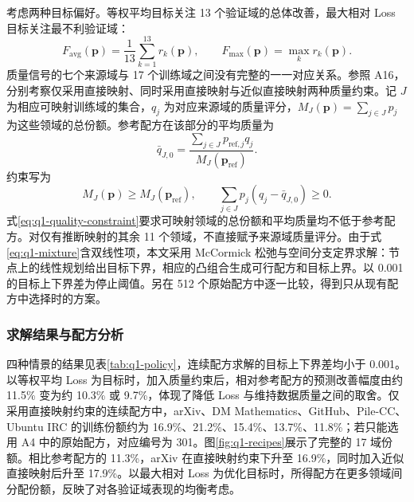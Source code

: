考虑两种目标偏好。等权平均目标关注 13 个验证域的总体改善，最大相对 Loss 目标关注最不利验证域：
\begin{equation}
 F_{\mathrm{avg}}(\boldsymbol p)=\frac1{13}\sum_{k=1}^{13}r_k(\boldsymbol p),
 \qquad F_{\mathrm{max}}(\boldsymbol p)=\max_k r_k(\boldsymbol p).
 \label{eq:q1-objectives}
\end{equation}
质量信号的七个来源域与 17 个训练域之间没有完整的一一对应关系。参照 A16，分别考察仅采用直接映射、同时采用直接映射与近似直接映射两种质量约束。记 $J$ 为相应可映射训练域的集合，$q_j$ 为对应来源域的质量评分，$M_J(\boldsymbol p)=\sum_{j\in J}p_j$ 为这些领域的总份额。参考配方在该部分的平均质量为
\begin{equation}
 \bar q_{J,0}=
 \frac{\sum_{j\in J}p_{\mathrm{ref},j}q_j}
 {M_J(\boldsymbol p_{\mathrm{ref}})}.
 \label{eq:q1-reference-quality}
\end{equation}
约束写为
\begin{equation}
 M_J(\boldsymbol p)\geqslant M_J(\boldsymbol p_{\mathrm{ref}}),\qquad
 \sum_{j\in J}p_j(q_j-\bar q_{J,0})\geqslant0.
 \label{eq:q1-quality-constraint}
\end{equation}
式\eqref{eq:q1-quality-constraint}要求可映射领域的总份额和平均质量均不低于参考配方。对仅有推断映射的其余 11 个领域，不直接赋予来源域质量评分。由于式\eqref{eq:q1-mixture}含双线性项，本文采用 McCormick 松弛与空间分支定界求解\cite{global2025}：节点上的线性规划给出目标下界，相应的凸组合生成可行配方和目标上界。以 0.001 的目标上下界差为停止阈值。另在 512 个原始配方中逐一比较，得到只从现有配方中选择时的方案。

\subsubsection{求解结果与配方分析}

四种情景的结果见表\ref{tab:q1-policy}，连续配方求解的目标上下界差均小于 0.001。以等权平均 Loss 为目标时，加入质量约束后，相对参考配方的预测改善幅度由约 11.5\% 变为约 10.3\% 或 9.7\%，体现了降低 Loss 与维持数据质量之间的取舍。仅采用直接映射约束的连续配方中，arXiv、DM Mathematics、GitHub、Pile-CC、Ubuntu IRC 的训练份额约为 16.9\%、21.2\%、15.4\%、13.7\%、11.8\%；若只能选用 A4 中的原始配方，对应编号为 301。图\ref{fig:q1-recipes}展示了完整的 17 域份额。相比参考配方的 11.3\%，arXiv 在直接映射约束下升至 16.9\%，同时加入近似直接映射后升至 17.9\%。以最大相对 Loss 为优化目标时，所得配方在更多领域间分配份额，反映了对各验证域表现的均衡考虑。


